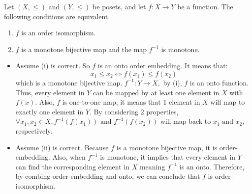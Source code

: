 \documentclass[11pt,a4paper]{exam}
\begin{document}
\begin{exo}
    Let $(X, \leq)$ and $(Y, \leq)$ be posets, and let $f \colon X \rightarrow Y$ be a function. 
    The following conditions are equivalent. 
    \begin{enumerate}
        \item $f$ is an order isomorphism.
        \item $f$ is a monotone bijective map and the map $f^{-1}$ is monotone.
    \end{enumerate}

    \begin{sol}
        \begin{itemize}
            \item Assume (i) is correct. So $f$ is an onto order embedding. It means that:
            \[
                x_1 \leq x_2 \Leftrightarrow f(x_1) \leq f(x_2)
            \]
            which is a monotone bijective map.
            $f^{-1} \colon Y \rightarrow X,$ by (i), $f$ is an onto function.
            Thus, every element in $Y$ can be mapped by at least one element in $X$ with $f(x)$.
            Also, $f$ is one-to-one map, it means that 1 element in $X$ will map to exactly one element in $Y$.
            By considering 2 properties, $\forall x_1, x_2 \in X, f^{-1}(f(x_1)) \text{ and } f^{-1}(f(x_2))$ will map back to $x_1 \text{ and } x_2,$ respectively.

            \item Assume (ii) is correct. Because $f$ is a monotone bijective map, it is order-embedding.
            Also, when $f^{-1}$ is  monotone, it implies that every element in $Y$ can find the corresponding element in $X$ meaning $f^{-1}$ is an onto. Therefore, by combing order-embedding and onto, we can conclude that $f$ is order-isomorphism.
        \end{itemize} 
    \end{sol}
\end{exo}
\end{document}
